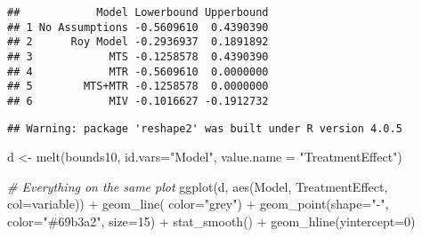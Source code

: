 \documentclass[
]{article}
\newenvironment{Shaded}{\begin{snugshade}}{\end{snugshade}}
\newcommand{\AttributeTok}[1]{\textcolor[rgb]{0.77,0.63,0.00}{#1}}
\newcommand{\CommentTok}[1]{\textcolor[rgb]{0.56,0.35,0.01}{\textit{#1}}}
\newcommand{\DecValTok}[1]{\textcolor[rgb]{0.00,0.00,0.81}{#1}}
\newcommand{\FunctionTok}[1]{\textcolor[rgb]{0.00,0.00,0.00}{#1}}
\newcommand{\NormalTok}[1]{#1}
\newcommand{\OtherTok}[1]{\textcolor[rgb]{0.56,0.35,0.01}{#1}}
\newcommand{\SpecialCharTok}[1]{\textcolor[rgb]{0.00,0.00,0.00}{#1}}
\newcommand{\StringTok}[1]{\textcolor[rgb]{0.31,0.60,0.02}{#1}}
\begin{document}
\begin{verbatim}
##            Model Lowerbound Upperbound
## 1 No Assumptions -0.5609610  0.4390390
## 2      Roy Model -0.2936937  0.1891892
## 3            MTS -0.1258578  0.4390390
## 4            MTR -0.5609610  0.0000000
## 5        MTS+MTR -0.1258578  0.0000000
## 6            MIV -0.1016627 -0.1912732
\end{verbatim}

\begin{Shaded}
\end{Shaded}

\begin{verbatim}
## Warning: package 'reshape2' was built under R version 4.0.5
\end{verbatim}

\begin{Shaded}
\begin{Highlighting}[]
\NormalTok{d }\OtherTok{\textless{}{-}} \FunctionTok{melt}\NormalTok{(bounds10, }\AttributeTok{id.vars=}\StringTok{"Model"}\NormalTok{, }\AttributeTok{value.name =} \StringTok{"TreatmentEffect"}\NormalTok{)}

\CommentTok{\# Everything on the same plot}
\FunctionTok{ggplot}\NormalTok{(d, }\FunctionTok{aes}\NormalTok{(Model, TreatmentEffect, }\AttributeTok{col=}\NormalTok{variable)) }\SpecialCharTok{+} 
  \FunctionTok{geom\_line}\NormalTok{( }\AttributeTok{color=}\StringTok{"grey"}\NormalTok{) }\SpecialCharTok{+}
  \FunctionTok{geom\_point}\NormalTok{(}\AttributeTok{shape=}\StringTok{"{-}"}\NormalTok{, }\AttributeTok{color=}\StringTok{"\#69b3a2"}\NormalTok{, }\AttributeTok{size=}\DecValTok{15}\NormalTok{) }\SpecialCharTok{+}
  \FunctionTok{stat\_smooth}\NormalTok{() }\SpecialCharTok{+}
  \FunctionTok{geom\_hline}\NormalTok{(}\AttributeTok{yintercept=}\DecValTok{0}\NormalTok{)}
\end{Highlighting}
\end{Shaded}
\end{document}
